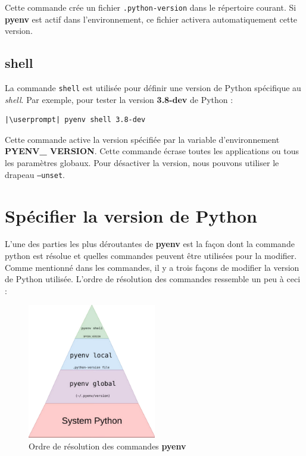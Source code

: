 Cette commande crée un fichier \texttt{.python-version} dans le répertoire courant. Si \textbf{pyenv} est actif dans l'environnement, ce fichier activera automatiquement cette version.

\subsection*{shell}
La commande \texttt{shell} est utilisée pour définir une version de Python spécifique au \textit{shell}. Par exemple, pour tester la version \textbf{3.8-dev} de Python :
\begin{lstlisting}[style=bash]
|\userprompt| pyenv shell 3.8-dev
\end{lstlisting}

Cette commande active la version spécifiée par la variable d'environnement \textbf{PYENV\_ VERSION}. Cette commande écrase toutes les applications ou tous les paramètres globaux. Pour désactiver la version, nous pouvons utiliser le drapeau \texttt{--unset}.

\section{Spécifier la version de Python}
L'une des parties les plus déroutantes de \textbf{pyenv} est la façon dont la commande python est résolue et quelles commandes peuvent être utilisées pour la modifier. Comme mentionné dans les commandes, il y a trois façons de modifier la version de Python utilisée. L'ordre de résolution des commandes ressemble un peu à ceci :

\begin{figure}[h!]
    \centering
    \includegraphics[width=0.5\textwidth]{IMG/pyenv.png} 
    \caption{Ordre de résolution des commandes \textbf{pyenv}}
\end{figure}

